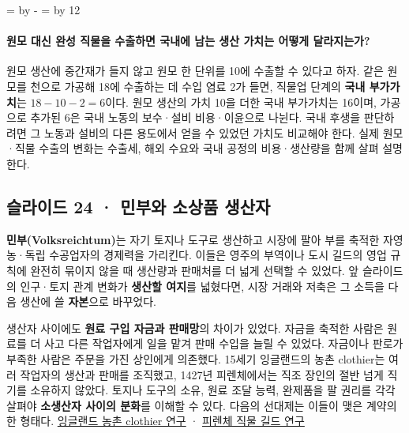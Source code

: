 \documentclass[10pt,a4paper]{article}
\newcommand{\ReserveQuestionSpace}{%
  \par\begingroup
  \dimen0=\pagegoal \advance\dimen0 by -\pagetotal
  \dimen2=\baselineskip \multiply\dimen2 by 12
  \ifdim\dimen0<\dimen2 \newpage\fi
  \endgroup}
\begin{document}
\ReserveQuestionSpace
\paragraph{원모 대신 완성 직물을 수출하면 국내에 남는 생산 가치는 어떻게 달라지는가?}
원모 생산에 중간재가 들지 않고 원모 한 단위를 10에 수출할 수 있다고 하자. 같은 원모를 천으로 가공해 18에 수출하는 데 수입 염료 2가 들면, 직물업 단계의 \textbf{국내 부가가치}는 $18-10-2=6$이다. 원모 생산의 가치 10을 더한 국내 부가가치는 16이며, 가공으로 추가된 6은 국내 노동의 보수·설비 비용·이윤으로 나뉜다. 국내 후생을 판단하려면 그 노동과 설비의 다른 용도에서 얻을 수 있었던 가치도 비교해야 한다. 실제 원모·직물 수출의 변화는 수출세, 해외 수요와 국내 공정의 비용·생산량을 함께 살펴 설명한다.\par

\subsection{슬라이드 24 · 민부와 소상품 생산자}
\textbf{민부(Volksreichtum)}는 자기 토지나 도구로 생산하고 시장에 팔아 부를 축적한 자영농·독립 수공업자의 경제력을 가리킨다. 이들은 영주의 부역이나 도시 길드의 영업 규칙에 완전히 묶이지 않을 때 생산량과 판매처를 더 넓게 선택할 수 있었다. 앞 슬라이드의 인구·토지 관계 변화가 \textbf{생산할 여지}를 넓혔다면, 시장 거래와 저축은 그 소득을 다음 생산에 쓸 \textbf{자본}으로 바꾸었다.\par

생산자 사이에도 \textbf{원료 구입 자금과 판매망}의 차이가 있었다. 자금을 축적한 사람은 원료를 더 사고 다른 작업자에게 일을 맡겨 판매 수입을 늘릴 수 있었다. 자금이나 판로가 부족한 사람은 주문을 가진 상인에게 의존했다. 15세기 잉글랜드의 농촌 clothier는 여러 작업자의 생산과 판매를 조직했고, 1427년 피렌체에서는 직조 장인의 절반 넘게 직기를 소유하지 않았다. 토지나 도구의 소유, 원료 조달 능력, 완제품을 팔 권리를 각각 살펴야 \textbf{소생산자 사이의 분화}를 이해할 수 있다. 다음의 선대제는 이들이 맺은 계약의 한 형태다. \href{https://www.cambridge.org/core/journals/rural-history/article/abs/clothiers-century-14501550/FEFB104D6FB9D0C265D7CE711BA79DBE}{잉글랜드 농촌 clothier 연구} · \href{https://www.cambridge.org/core/journals/international-review-of-social-history/article/political-economy-of-european-craft-guilds-power-relations-and-economic-strategies-of-merchants-and-master-artisans-in-the-medieval-and-early-modern-textile-industries/CB6B4FD5B10DF57521C5B44F2BBF2A55}{피렌체 직물 길드 연구}\par
\end{document}
